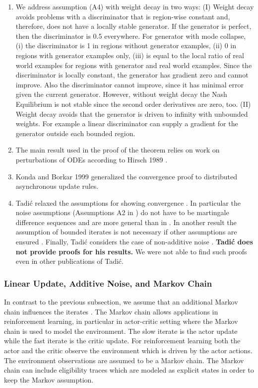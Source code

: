 \documentclass{article}
\begin{document}
\begin{enumerate}[label=\textbf{(C\arabic*)}]
\item We address assumption (A4)
with weight decay in two ways: (I) Weight decay avoids problems with a
discriminator that is region-wise constant and, therefore, does not have a
locally stable generator. If the generator is perfect, then the discriminator is
0.5 everywhere. For generator with mode collapse, (i) the discriminator is 1 in
regions without generator examples, (ii) 0 in regions with generator examples
only, (iii) is equal to the local ratio of real world examples for regions with
generator and real world examples. Since the discriminator is locally constant,
the generator has gradient zero and cannot improve. Also the discriminator
cannot improve, since it has minimal error given the current generator. However,
without weight decay the Nash Equilibrium is not stable since the second order
derivatives are zero, too. (II) Weight decay avoids that the generator is driven
to infinity with unbounded weights. For example a linear discriminator can supply a gradient for the
generator outside each bounded region.

\item
The main result used in the proof of the theorem relies on work on
perturbations of ODEs according to Hirsch 1989 \cite{Hirsch:89}.

\item
Konda and Borkar 1999 \cite{Konda:99} generalized the convergence
proof to distributed asynchronous update rules.

\item
Tadi\'{c} relaxed the assumptions for showing convergence \cite{Tadic:04a}.
In particular the noise assumptions (Assumptions A2 in
\cite{Tadic:04a}) do not have to be martingale
difference sequences and are more general than in
\cite{Borkar:97}. In another result the assumption of bounded iterates
is not necessary if other assumptions are ensured \cite{Tadic:04a}.
Finally, Tadi\'{c} considers the case of non-additive noise \cite{Tadic:04a}.
{\bf Tadi\'{c} does not provide proofs for his results.}
We were not able to find such proofs even in other publications of Tadi\'{c}.

\end{enumerate}

\subsubsection{Linear Update, Additive Noise, and Markov Chain}
\label{sec:linupnoisemc}

In contrast to the previous subsection, we assume that an additional Markov
chain influences the iterates \cite{Konda:02,Konda:03}.
The Markov chain allows applications in reinforcement learning, in
particular in actor-critic setting where the Markov chain is used to
model the environment. The slow iterate is the actor
update while the fast iterate is the critic update.
For reinforcement learning both the actor and the critic observe the
environment which is driven by the actor actions. The environment
observations are assumed to be a Markov chain. The Markov chain can
include eligibility traces which are modeled as explicit states in
order to keep the Markov assumption.
\end{document}
